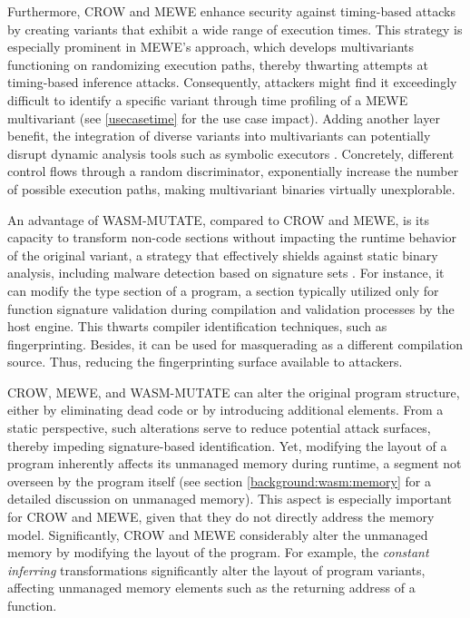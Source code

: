 Furthermore, CROW and MEWE enhance security against timing-based attacks by creating variants that exhibit a wide range of execution times. 
This strategy is especially prominent in MEWE’s approach, which develops multivariants functioning on randomizing execution paths, thereby thwarting attempts at timing-based inference attacks. 
Consequently, attackers might find it exceedingly difficult to identify a specific variant through time profiling of a MEWE multivariant (see \autoref{usecasetime} for the use case impact).
Adding another layer benefit, the integration of diverse variants into multivariants can potentially disrupt dynamic analysis tools such as symbolic executors \cite{wasmixer}. 
Concretely, different control flows through a random discriminator, exponentially increase the number of possible execution paths, making multivariant binaries virtually unexplorable.



An advantage of WASM-MUTATE, compared to CROW and MEWE, is its capacity to transform non-code sections without impacting the runtime behavior of the original variant, a strategy that effectively shields against static binary analysis, including malware detection based on signature sets \cite{EVASION}.
For instance, it can modify the type section of a \Wasm program, a section typically utilized only for function signature validation during compilation and validation processes by the host engine. 
This thwarts compiler identification techniques, such as fingerprinting.
Besides, it can be used for masquerading as a different compilation source.
Thus, reducing the fingerprinting surface available to attackers.


CROW, MEWE, and WASM-MUTATE can alter the original program structure, either by eliminating dead code or by introducing additional elements. 
From a static perspective, such alterations serve to reduce potential attack surfaces, thereby impeding signature-based identification.
Yet, modifying the layout of a \Wasm program inherently affects its unmanaged memory during runtime, a segment not overseen by the \Wasm program itself (see section \autoref{background:wasm:memory} for a detailed discussion on unmanaged memory). 
This aspect is especially important for CROW and MEWE, given that they do not directly address the \Wasm memory model.
Significantly, CROW and MEWE considerably alter the unmanaged memory by modifying the layout of the \Wasm program.
For example, the \emph{constant inferring} transformations significantly alter the layout of program variants, affecting unmanaged memory elements such as the returning address of a function.


